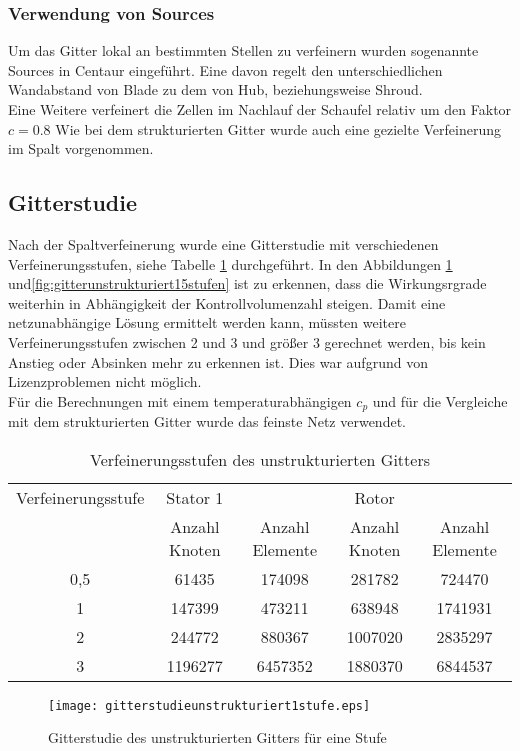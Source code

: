 \subsubsection{Verwendung von Sources}
Um das Gitter lokal an bestimmten Stellen zu verfeinern wurden sogenannte Sources in Centaur eingeführt.
Eine davon regelt den unterschiedlichen Wandabstand von Blade zu dem von Hub, beziehungsweise Shroud.\\
Eine Weitere verfeinert die Zellen im Nachlauf der Schaufel relativ um den Faktor $c = 0.8$
\image
Wie bei dem strukturierten Gitter wurde auch eine gezielte Verfeinerung im Spalt vorgenommen.

\subsection{Gitterstudie}
Nach der Spaltverfeinerung wurde eine Gitterstudie mit verschiedenen Verfeinerungsstufen, siehe Tabelle \ref{tab:verfeinerungenunstrukturiert} durchgeführt. In den Abbildungen \ref{fig:gitterunstrukturiert1stufe} und\ref{fig:gitterunstrukturiert15stufen} ist zu erkennen, dass die Wirkungsrgrade weiterhin in Abhängigkeit der Kontrollvolumenzahl steigen. Damit eine netzunabhängige Lösung ermittelt werden kann, müssten weitere Verfeinerungsstufen zwischen 2 und 3 und größer 3 gerechnet werden, bis kein Anstieg oder Absinken mehr zu erkennen ist. Dies war aufgrund von Lizenzproblemen nicht möglich.\\
Für die Berechnungen mit einem temperaturabhängigen $c_p$ und für die Vergleiche mit dem strukturierten Gitter wurde das feinste Netz verwendet.
\begin{table}[h]
		\centering
		\caption{Verfeinerungsstufen des unstrukturierten Gitters}
	\begin{tabular}{ c| c | c| c| c}
Verfeinerungsstufe	&	Stator 1	&		&	Rotor	&		\\
&	Anzahl Knoten	&	Anzahl Elemente	&	Anzahl Knoten	&	Anzahl Elemente	\\
\hline									
0,5	&	61435	&	174098	&	281782	&	724470	\\
1	&	147399	&	473211	&	638948	&	1741931	\\
2	&	244772	&	880367	&	1007020	&	2835297	\\
3	&	1196277	&	6457352	&	1880370	&	6844537	\\

	\end{tabular}
		\label{tab:verfeinerungenunstrukturiert}
\end{table}
\begin{figure}[htbp]
	\centering
	\texttt{[image: gitterstudieunstrukturiert1stufe.eps]}
	\caption{Gitterstudie des unstrukturierten Gitters für eine Stufe} \label{fig:gitterunstrukturiert1stufe}
\end{figure}

